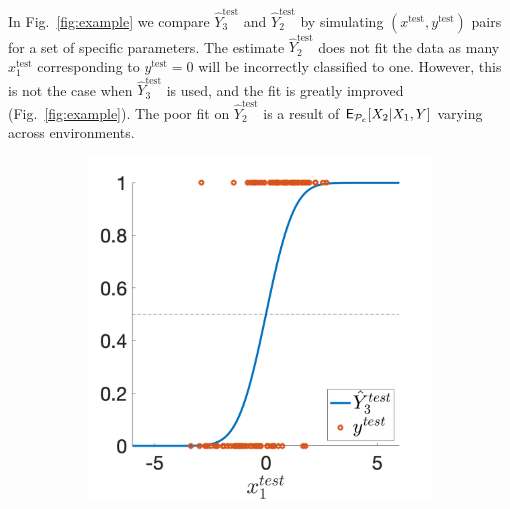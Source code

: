 \documentclass[conference,letterpaper]{IEEEtran}
\begin{document}
In Fig.~\ref{fig:example} we compare  $\hat{Y}^{\text{test}}_3$ and  $\hat{Y}^{\text{test}}_2$ by simulating $(x^{\text{test}},y^{\text{test}})$ pairs for a set of specific parameters. The estimate $\hat{Y}^{\text{test}}_2$ does not fit the data as many $x_1^{\text{test}}$ corresponding to $y^{\text{test}}=0$ will be incorrectly classified to one. However, this is not the case when $\hat{Y}^{\text{test}}_3$ is used, and the fit is greatly improved (Fig.~\ref{fig:example}). The poor fit on $\hat{Y}^{\text{test}}_2$ is a result of $\operatorname{\sf E}_{\mathcal{P}_e}[X_2|X_1,Y]$ varying across environments. 

\begin{center}
\begin{figure}[h]
  \begin{subfigure}[b]{0.45\columnwidth}   
\vspace{-2em}\includegraphics[width=\linewidth]{probit_example_X3.png}
    \label{fig:EYgZ1X3}
  \end{subfigure}
  \begin{subfigure}[b]{0.45\columnwidth}
\vspace{-2em}

\end{subfigure}
\end{figure}
\end{center}
\end{document}
